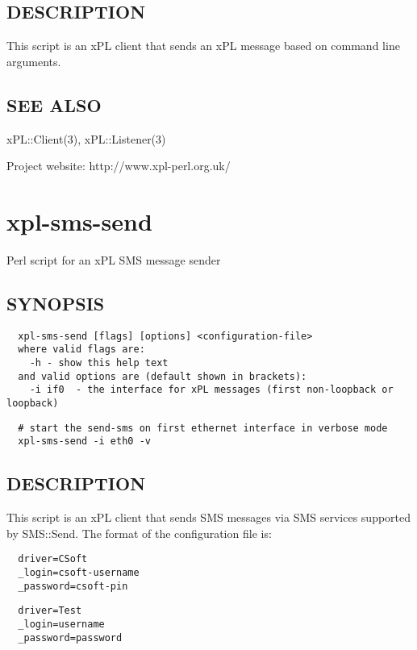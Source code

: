\documentclass[12pt,a4paper]{article}
\begin{document}
\subsection*{DESCRIPTION\label{xpl-sender_DESCRIPTION}}


This script is an xPL client that sends an xPL message based on
command line arguments.

\subsection*{SEE ALSO\label{xpl-sender_SEE_ALSO}}


xPL::Client(3), xPL::Listener(3)



Project website: http://www.xpl-perl.org.uk/

\newpage
\section{xpl-sms-send\label{xpl-sms-send}}


Perl script for an xPL SMS message sender

\subsection*{SYNOPSIS\label{xpl-sms-send_SYNOPSIS}}
\begin{verbatim}
  xpl-sms-send [flags] [options] <configuration-file>
  where valid flags are:
    -h - show this help text
  and valid options are (default shown in brackets):
    -i if0  - the interface for xPL messages (first non-loopback or loopback)
\end{verbatim}
\begin{verbatim}
  # start the send-sms on first ethernet interface in verbose mode
  xpl-sms-send -i eth0 -v
\end{verbatim}
\subsection*{DESCRIPTION\label{xpl-sms-send_DESCRIPTION}}


This script is an xPL client that sends SMS messages via SMS services
supported by SMS::Send.  The format of the configuration file is:

\begin{verbatim}
  driver=CSoft
  _login=csoft-username
  _password=csoft-pin
\end{verbatim}
\begin{verbatim}
  driver=Test
  _login=username
  _password=password
\end{verbatim}
\end{document}
